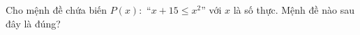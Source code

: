 \begin{ex}
Cho mệnh đề chứa biến $P(x)\colon$ ``$x+15\le x^2$'' với $x$ là số thực. Mệnh đề nào sau đây là đúng?
\end{ex}
